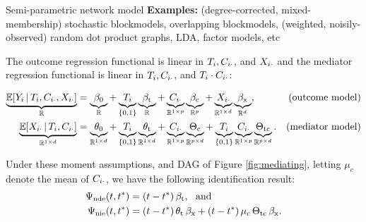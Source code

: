 \documentclass[final]{beamer}
\newlength{\colwidth}
\begin{document}
\begin{frame}[t]
\begin{columns}[t]
\begin{column}{\colwidth}
\begin{block}{Semi-parametric network model}
                \textbf{Examples:} (degree-corrected, mixed-membership) stochastic blockmodels, overlapping blockmodels, (weighted, noisily-observed) random dot product graphs, LDA, factor models, etc

                The outcome regression functional is linear in $T_i, C_{i \cdot}$, and $X_{i \cdot}$ and the mediator regression functional is linear in $T_i, C_{i \cdot}$, and $T_i \cdot C_{i \cdot}$:

                \begin{equation*}
                    \begin{aligned}
                        \underbrace{\E[T_i, \C_{i \cdot}, \X_{i \cdot}]{Y_i}}_{\R}
                         & = \underbrace{\betazero}_{\R}
                        + \underbrace{T_i}_{\{0, 1\}} \underbrace{\betat}_{\R}
                        + \underbrace{\C_{i \cdot}}_{\R^{1 \times p}} \underbrace{\betac}_{\R^{p}}
                        + \underbrace{\X_{i \cdot}}_{\R^{1 \times d}} \underbrace{\betax}_{\R^d},
                         & \text{(outcome model)}                      \\
                        \underbrace{\E[T_i, \C_{i \cdot}]{\X_{i \cdot}}}_{\R^{1 \times d}}
                         & = \underbrace{\thetazero}_{\R^{1 \times d}}
                        + \underbrace{T_i}_{\{0, 1\}} \underbrace{\thetat}_{\R^{1 \times d}}
                        + \underbrace{\C_{i \cdot}}_{\R^{1 \times p}} \underbrace{\Thetac}_{\R^{p \times d}}
                        + \underbrace{T_i}_{\{0, 1\}} \underbrace{\C_{i \cdot}}_{\R^{1 \times p}} \underbrace{\Thetatc}_{\R^{p \times d}}.
                         & \text{(mediator model)}
                    \end{aligned}
                \end{equation*}

                Under these moment assumptions, and DAG of Figure \ref{fig:mediating}, letting $\mu_c$ denote the mean of $C_{i \cdot}$, we have the following identification result:
                \begin{align*}
                    \ndef & = \paren*{t - t^*} \, \betat, ~ \text{ and }                                        \\
                    \nief & = \paren*{t - t^*} \, \thetat \, \betax + (t - t^*) \, \mu_c \, \Thetatc \, \betax.
                \end{align*}
            \end{block}


\end{column}
\end{columns}
\end{frame}
\end{document}
